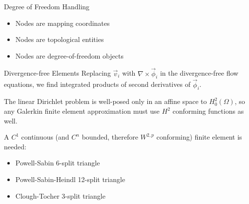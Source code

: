 \begin{foil}{Degree of Freedom Handling}

\begin{center}
\end{center}

\begin{itemize}
  \item Nodes are mapping coordinates
  \item Nodes are topological entities
  \item Nodes are degree-of-freedom objects
\end{itemize}

\end{foil}

\begin{foil}{Divergence-free Elements}
Replacing $\vec{v}_i$ with $\nabla \times \vec{\phi}_i$ in the
divergence-free flow equations, we find integrated products of second
derivatives of $\vec{\phi}_i$.

The linear Dirichlet problem is well-posed only in an affine space to
$H^2_0(\Omega)$, so any Galerkin finite element approximation must
use $H^2$ conforming functions as well.

A $C^1$ continuous (and $C^n$ bounded, therefore $W^{2,p}$ conforming)
finite element is needed:

\begin{itemize}
	\item Powell-Sabin 6-split triangle
	\item Powell-Sabin-Heindl 12-split triangle
	\item Clough-Tocher 3-split triangle
\end{itemize}
\end{foil}



